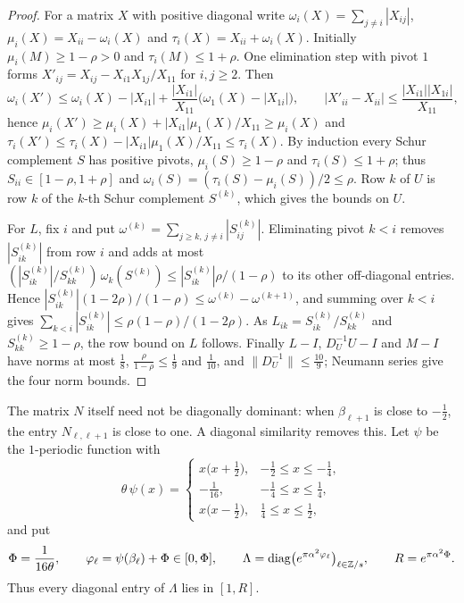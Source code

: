 \begin{proof}
For a matrix $X$ with positive diagonal write
$\omega_i(X)=\sum_{j\ne i}|X_{ij}|$, $\mu_i(X)=X_{ii}-\omega_i(X)$ and
$\tau_i(X)=X_{ii}+\omega_i(X)$. Initially $\mu_i(M)\ge1-\rho>0$ and
$\tau_i(M)\le1+\rho$. One elimination step with pivot $1$ forms
$X'_{ij}=X_{ij}-X_{i1}X_{1j}/X_{11}$ for $i,j\ge2$. Then
\[
 \omega_i(X')\le\omega_i(X)-|X_{i1}|+\frac{|X_{i1}|}{X_{11}}
 \bigl(\omega_1(X)-|X_{1i}|\bigr),\qquad
 |X'_{ii}-X_{ii}|\le\frac{|X_{i1}||X_{1i}|}{X_{11}},
\]
hence $\mu_i(X')\ge\mu_i(X)+|X_{i1}|\mu_1(X)/X_{11}\ge\mu_i(X)$ and
$\tau_i(X')\le\tau_i(X)-|X_{i1}|\mu_1(X)/X_{11}\le\tau_i(X)$. By induction
every Schur complement $S$ has positive pivots,
$\mu_i(S)\ge1-\rho$ and $\tau_i(S)\le1+\rho$; thus
$S_{ii}\in[1-\rho,1+\rho]$ and $\omega_i(S)=(\tau_i(S)-\mu_i(S))/2\le\rho$.
Row $k$ of $U$ is row $k$ of the $k$-th Schur complement $S^{(k)}$, which gives
the bounds on $U$.

For $L$, fix $i$ and put $\omega^{(k)}=\sum_{j\ge k,\,j\ne i}|S^{(k)}_{ij}|$.
Eliminating pivot $k<i$ removes $|S^{(k)}_{ik}|$ from row $i$ and adds at most
$(|S^{(k)}_{ik}|/S^{(k)}_{kk})\,\omega_k(S^{(k)})\le|S^{(k)}_{ik}|\rho/(1-\rho)$
to its other off-diagonal entries. Hence
$|S^{(k)}_{ik}|(1-2\rho)/(1-\rho)\le\omega^{(k)}-\omega^{(k+1)}$, and summing
over $k<i$ gives $\sum_{k<i}|S^{(k)}_{ik}|\le\rho(1-\rho)/(1-2\rho)$. As
$L_{ik}=S^{(k)}_{ik}/S^{(k)}_{kk}$ and $S^{(k)}_{kk}\ge1-\rho$, the row bound on
$L$ follows. Finally $L-I$, $D_U^{-1}U-I$ and $M-I$ have norms at most
$\frac18$, $\frac{\rho}{1-\rho}\le\frac19$ and $\frac1{10}$, and
$\|D_U^{-1}\|\le\frac{10}9$; Neumann series give the four norm bounds.
\end{proof}

The matrix $N$ itself need not be diagonally dominant: when
$\beta_{\ell+1}$ is close to $-\frac12$, the entry $N_{\ell,\ell+1}$ is close to
one. A diagonal similarity removes this. Let $\psi$ be the $1$-periodic
function with
\[
 \theta\,\psi(x)=\begin{cases}
 x\bigl(x+\frac12\bigr),&-\frac12\le x\le-\frac14,\\[2pt]
 -\frac1{16},&-\frac14\le x\le\frac14,\\[2pt]
 x\bigl(x-\frac12\bigr),&\frac14\le x\le\frac12,
 \end{cases}
\]
and put
\[
 \Phi=\frac1{16\theta},\qquad \varphi_\ell=\psi(\beta_\ell)+\Phi\in[0,\Phi],
 \qquad \Lambda={\rm diag}\bigl(e^{\pi\alpha^2\varphi_\ell}\bigr)_{\ell\in\mathbb Z/s},
 \qquad R=e^{\pi\alpha^2\Phi}.
\]
Thus every diagonal entry of $\Lambda$ lies in $[1,R]$.

